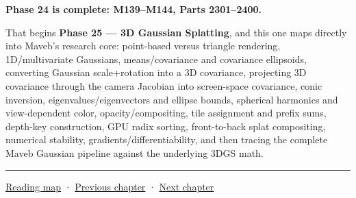 \textbf{Phase 24 is complete: M139--M144, Parts 2301--2400.}

That begins \textbf{Phase 25 --- 3D Gaussian Splatting}, and this one maps directly into Maveb's research core: point-based versus triangle rendering, 1D/multivariate Gaussians, means/covariance and covariance ellipsoids, converting Gaussian scale+rotation into a 3D covariance, projecting 3D covariance through the camera Jacobian into screen-space covariance, conic inversion, eigenvalues/eigenvectors and ellipse bounds, spherical harmonics and view-dependent color, opacity/compositing, tile assignment and prefix sums, depth-key construction, GPU radix sorting, front-to-back splat compositing, numerical stability, gradients/differentiability, and then tracing the complete Maveb Gaussian pipeline against the underlying 3DGS math.

\begin{center}\rule{0.5\linewidth}{0.5pt}\end{center}

\href{Chapter\%20Edition/03\%20-\%20Game\%20Engine/00\%20-\%20Reading\%20Map}{Reading map} · \hyperref[06-engine-ii-ch043]{Previous chapter} · \hyperref[06-engine-ii-ch045]{Next chapter}
